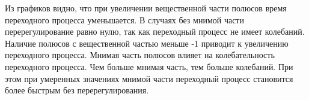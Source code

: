 Из графиков видно, что при увеличении вещественной части полюсов время переходного процесса уменьшается.
В случаях без мнимой части перерегулирование равно нулю, так как переходный процесс не имеет колебаний.
Наличие полюсов с вещественной частью меньше -1 приводит к увеличению переходного процесса. Мнимая часть
полюсов влияет на колебательность переходного процесса. Чем больше мнимая часть, тем больше колебаний.
При этом при умеренных значениях мнимой части переходный процесс становится более быстрым без перерегулирования.
\endinput